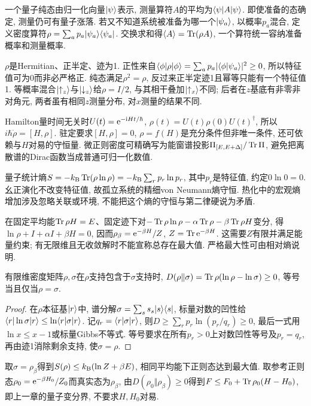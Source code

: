 \label{ch:density}
一个量子纯态由归一化向量$\lvert \psi\rangle$表示, 测量算符$A$的平均为$\langle \psi\rvert A\lvert \psi\rangle$. 即使准备的态确定, 测量仍可有量子涨落. 若又不知道系统被准备为哪一个$\lvert \psi_a\rangle$, 以概率$p_a$混合, 定义密度算符$\rho=\sum_ap_a\lvert \psi_a\rangle\langle \psi_a\rvert$. 交换求和得$\langle A\rangle=\operatorname{Tr}(\rho A)$, 一个算符统一容纳准备概率和测量概率.

$\rho$是Hermitian、正半定、迹为1. 正性来自$\langle \phi\rvert\rho\lvert \phi\rangle=\sum_ap_a|\langle\phi|\psi_a\rangle|^2\ge0$, 所以特征值可为0而非必严格正. 纯态满足$\rho^2=\rho$, 反过来正半定迹1且幂等只能有一个特征值1. 等概率混合$\lvert \uparrow_z\rangle$与$\lvert \downarrow_z\rangle$给$\rho=I/2$, 与其相干叠加$\lvert \uparrow_x\rangle$不同; 后者在$z$基底有非零非对角元, 两者虽有相同$z$测量分布, 对$x$测量的结果不同.

Hamilton量时间无关时$U(t)=\mathrm e^{-\mathrm i Ht/\hbar}$, $\rho(t)=U(t)\rho(0)U(t)^\dagger$, 所以$i\hbar\dot\rho=[H,\rho]$. 驻定要求$[H,\rho]=0$, $\rho=f(H)$是充分条件但非唯一条件, 还可依赖与$H$对易的守恒量. 微正则密度可精确写为能窗谱投影$\Pi_{[E,E+\Delta]}/\operatorname{Tr}\Pi$, 避免把离散谱的Dirac函数当成普通可归一化数值.

量子统计熵$S=-k_{\mathrm B}\operatorname{Tr}(\rho\ln\rho)=-k_{\mathrm B}\sum_rp_r\ln p_r$, 其中$p_r$是特征值, 约定$0\ln0=0$. 幺正演化不改变特征值, 故孤立系统的精细von Neumann熵守恒. 热化中的宏观熵增加涉及忽略关联或环境, 不能把这个熵的守恒与第二律硬说为矛盾.

在固定平均能$\operatorname{Tr}\rho H=E$、固定迹下对$-\operatorname{Tr}\rho\ln\rho-\alpha\operatorname{Tr}\rho-\beta\operatorname{Tr}\rho H$变分, 得$\ln\rho+I+\alpha I+\beta H=0$, 因而$\rho_\beta=\mathrm e^{-\beta H}/Z$, $Z=\operatorname{Tr}\mathrm e^{-\beta H}$. 这需要$Z$有限并满足能量约束; 有无限维且无收敛解时不能宣称总存在最大值. 严格最大性可由相对熵说明.

\begin{proposition}
有限维密度矩阵$\rho,\sigma$在$\rho$支持包含于$\sigma$支持时, $D(\rho\Vert\sigma)=\operatorname{Tr}\rho(\ln\rho-\ln\sigma)\ge0$, 等号当且仅当$\rho=\sigma$.
\end{proposition}
\begin{proof}
在$\rho$本征基$\lvert r\rangle$中, 谱分解$\sigma=\sum_ss_s\lvert s\rangle\langle s\rvert$, 标量对数的凹性给$\langle r\rvert\ln\sigma\lvert r\rangle\le\ln\langle r\rvert\sigma\lvert r\rangle$. 记$q_r=\langle r\rvert\sigma\lvert r\rangle$, 则$D\ge\sum_rp_r\ln(p_r/q_r)\ge0$, 最后一式用$\ln x\le x-1$或标量Gibbs不等式. 等号要求在所有$p_r>0$上对数凹性等号及$p_r=q_r$, 再由迹1消除剩余支持, 使$\sigma=\rho$.
\end{proof}
取$\sigma=\rho_\beta$得到$S(\rho)\le k_{\mathrm B}(\ln Z+\beta E)$, 相同平均能下正则态达到最大值. 取参考正则态$\rho_0=\mathrm e^{-\beta H_0}/Z_0$而真实态为$\rho_\beta$, 由$D(\rho_0\Vert\rho_\beta)\ge0$得到$F\le F_0+\operatorname{Tr}\rho_0(H-H_0)$, 即上一章的量子变分界, 不要求$H,H_0$对易.

